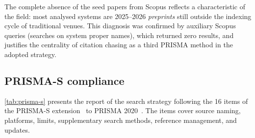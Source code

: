 The complete absence of the seed papers from Scopus reflects a characteristic of the field:
most analysed systems are 2025--2026 \textit{preprints} still outside the indexing cycle of
traditional venues.
This diagnosis was confirmed by auxiliary Scopus queries (searches on system proper names),
which returned zero results, and justifies the centrality of citation chasing as a third
PRISMA method in the adopted strategy.

\subsection{PRISMA-S compliance}
\label{ap:prisma-s}

\autoref{tab:prisma-s} presents the report of the search strategy following the 16 items of
the PRISMA-S extension~\citep{rethlefsen2021prismas} to PRISMA
2020~\citep{page2021prisma}.
The items cover source naming, platforms, limits, supplementary search methods, reference
management, and updates.

